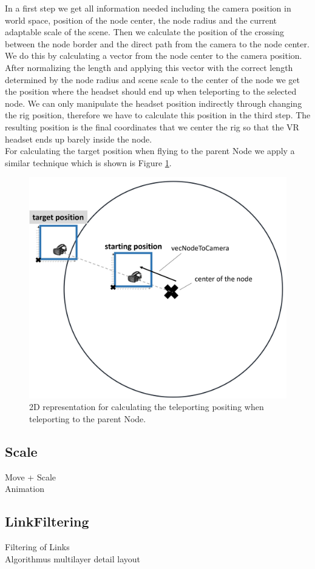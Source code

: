 In a first step we get all information needed including the camera position in world space, position of the node center, the node radius and the current adaptable scale of the scene.
Then we calculate the position of the crossing between the node border and the direct path from the camera to the node center. We do this by calculating a vector from the node center to the camera position. After normalizing the length and applying this vector with the correct length determined by the node radius and scene scale to the center of the node we get the position where the headset should end up when teleporting to the selected node.
We can only manipulate the headset position indirectly through changing the rig position, therefore we have to calculate this position in the third step. 
The resulting position is the final coordinates that we center the rig so that the VR headset ends up barely inside the node.\\
For calculating the target position when flying to the parent Node we apply a similar technique which is shown is Figure \ref{fig:vrFlyToParentNode}.

\begin{figure}[h]
    \centering
    \includegraphics[width=1\textwidth]{graphics/flyToParentNode.jpg}
    \caption{2D representation for calculating the teleporting positing when teleporting to the parent Node.} 
    \label{fig:vrFlyToParentNode} 
\end{figure}

\subsection{Scale}
\label{sec:scaling}

Move + Scale\\
Animation
\\

\subsection{LinkFiltering}
\label{sec:linkFiltering}

Filtering of Links\\
Algorithmus multilayer detail layout\\
